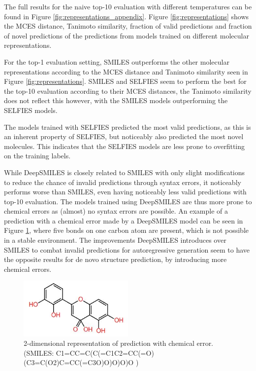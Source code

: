 The full results for the naive top-10 evaluation with different temperatures can be found in Figure \ref{fig:representations_appendix}.
Figure \ref{fig:representations} shows the MCES distance, Tanimoto similarity, fraction of valid predictions and fraction of novel predictions of the predictions from models trained on different molecular representations.

For the top-1 evaluation setting, SMILES outperforms the other molecular representations according to the MCES distance and Tanimoto similarity seen in Figure \ref{fig:representations}.
SMILES and SELFIES seem to perform the best for the top-10 evaluation according to their MCES distances, the Tanimoto similarity does not reflect this however, with the SMILES models outperforming the SELFIES models.

The models trained with SELFIES predicted the most valid predictions, as this is an inherent property of SELFIES, but noticeably also predicted the most novel molecules.
This indicates that the SELFIES models are less prone to overfitting on the training labels.

While DeepSMILES is closely related to SMILES with only slight modifications to reduce the chance of invalid predictions through syntax errors, it noticeably performs worse than SMILES, even having noticeably less valid predictions with top-10 evaluation.
The models trained using DeepSMILES are thus more prone to chemical errors as (almost) no syntax errors are possible.
An example of a prediction with a chemical error made by a DeepSMILES model can be seen in Figure \ref{fig:invalid_pred}, where five bonds on one carbon atom are present, which is not possible in a stable environment.
The improvements DeepSMILES introduces over SMILES to combat invalid predictions for autoregressive generation seem to have the opposite results for de novo structure prediction, by introducing more chemical errors.
\begin{figure}[h]
    \centering
    \includegraphics[width=0.5\textwidth]{figures/results/invalid_pred.JPG}
    \caption{2-dimensional representation of prediction with chemical error. (SMILES: C1=CC=C(C(=C1C2=CC(=O)(C3=C(O2)C=CC(=C3O)O)O)O)O )}
    \label{fig:invalid_pred}
\end{figure}

